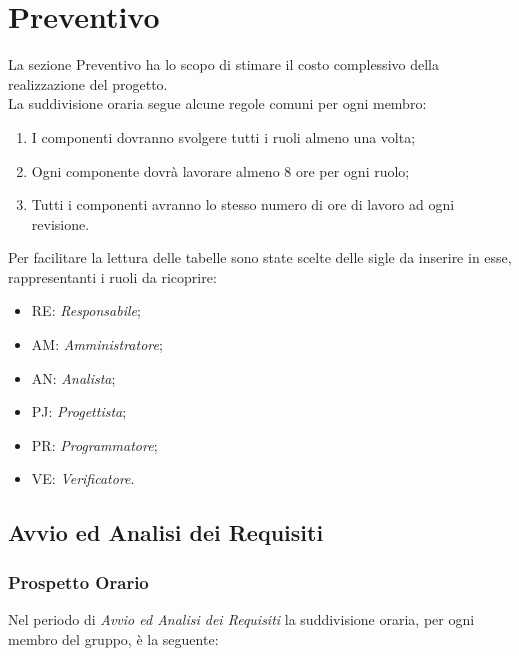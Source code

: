 \section{Preventivo}
\label{Preventivo}

La sezione Preventivo ha lo scopo di stimare il costo complessivo della realizzazione del progetto. \\ 
La suddivisione oraria segue alcune regole comuni per ogni membro:
\begin{enumerate}

	\item I componenti dovranno svolgere tutti i ruoli almeno una volta;
	\item Ogni componente dovrà lavorare almeno 8 ore per ogni ruolo;
	\item Tutti i componenti avranno lo stesso numero di ore di lavoro ad ogni revisione.

\end{enumerate}
Per facilitare la lettura delle tabelle sono state scelte delle sigle da inserire in esse, rappresentanti i ruoli da ricoprire:
\begin{itemize}
	\item RE: \textit{Responsabile};
	\item AM: \textit{Amministratore};
	\item AN: \textit{Analista};
	\item PJ: \textit{Progettista};
	\item PR: \textit{Programmatore};
	\item VE: \textit{Verificatore}.
\end{itemize}

\newpage
\subsection{Avvio ed Analisi dei Requisiti}
\label{PAAR}
\subsubsection{Prospetto Orario}

Nel periodo di \textit{Avvio ed Analisi dei Requisiti} la suddivisione oraria, per ogni membro del gruppo, è la seguente:

